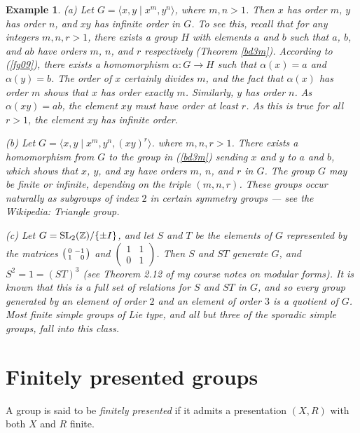 \documentclass[a4paper,11pt,final]{memoir}%
\newtheorem{example}[X]{Example}
\theoremstyle{nonumberplain}
\begin{document}
\begin{example}
\label{fg10a}(a) Let $G=\langle x,y\mid x^{m},y^{n}\rangle$, where $m,n>1$.
Then $x$ has order $m$, $y$ has order $n$, and $xy$ has infinite order in $G$.
To see this, recall that for any integers $m,n,r>1$, there exists a group $H$
with elements $a$ and $b$ such that $a$, $b$, and $ab$ have orders $m$, $n$,
and $r$ respectively (Theorem \ref{bd3m}). According to (\ref{fg09}), there
exists a homomorphism $\alpha\colon G\rightarrow H$ such that $\alpha(x)=a$
and $\alpha(y)=b$. The order of $x$ certainly divides $m$, and the fact that
$\alpha(x)$ has order $m$ shows that $x$ has order exactly $m$. Similarly, $y$
has order $n$. As $\alpha(xy)=ab$, the element $xy$ must have order at least
$r$. As this is true for all $r>1$, the element $xy$ has infinite order.

(b) Let $G=\langle x,y\mid x^{m},y^{n},(xy)^{r}\rangle$. where $m,n,r>1$.
There exists a homomorphism from $G$ to the group in (\ref{bd3m}) sending $x$
and $y$ to $a$ and $b$, which shows that $x$, $y$, and $xy$ have orders $m$,
$n$, and $r$ in $G$. The group $G$ may be finite or infinite, depending on the
triple $(m,n,r)$. These groups occur naturally as subgroups of index $2$ in
certain symmetry groups --- see the Wikipedia: Triangle group.

(c) Let $G=\operatorname{SL}_{2}(\mathbb{Z}{})/\{\pm I\}$, and let $S$ and $T$ be the
elements of $G$ represented by the matrices $\left(
\begin{smallmatrix}
0 & -1\\
1 & \hfill0
\end{smallmatrix}
\right)  $ and $\left(
\begin{smallmatrix}
1 & 1\\
0 & 1
\end{smallmatrix}
\right)  $. Then $S$ and $ST$ generate $G$, and $S^{2}=1=(ST)^{3}$ (see
Theorem 2.12 of my course notes on modular forms). It is known that this is a
full set of relations for $S$ and $ST$ in $G$, and so every group generated by
an element of order $2$ and an element of order $3$ is a quotient of $G$. Most
finite simple groups of Lie type, and all but three of the sporadic simple
groups, fall into this class.
\end{example}

\section{Finitely presented groups}

A group is said to be \emph{finitely presented\/}%
if it admits a presentation $(X,R)$ with both $X$ and $R$ finite.
\end{document}
